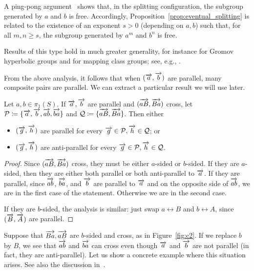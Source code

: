 \begin{remark}
A ping-pong argument~\cite[\S 8.2.E]{Gromov1987HyperbolicGroups}
shows that, in the splitting configuration, the subgroup generated by $a$ and $b$
is free.
Accordingly, Proposition~\ref{prop:eventual_splitting} is related to the existence
of an exponent $s>0$ (depending on $a,b$) such that, for all $m,n \ge s$,
the subgroup generated by $a^m$ and $b^n$ is free.

Results of this type hold in much greater generality, for instance for
Gromov hyperbolic groups and for mapping class groups; see, e.g.,
\cite{Fujiwara2015SubgroupsPseudoAnosovII}.
\end{remark}

From the above analysis, it follows that when $(\overrightarrow{a},\overrightarrow{b})$ are
parallel, many composite pairs are parallel. We can extract a
particular result we will use later.
\begin{lemma}\label{lem:a_parallel_Ba}
Let $a,b \in \pi_1(S)$.
If $\overrightarrow{a},\overrightarrow{b}$ are parallel and $(\overrightarrow{aB}, \overrightarrow{Ba})$ cross,
let $\mathcal{P} \coloneqq \{ \overrightarrow{a},\overrightarrow{b}, \overrightarrow{ab},\overrightarrow{ba} \}$
and $\mathcal{Q} \coloneqq \{ \overrightarrow{aB}, \overrightarrow{Ba} \}$. Then either
\begin{itemize}
\item $(\overrightarrow{g},\overrightarrow{h})$ are parallel for every $\overrightarrow{g} \in \mathcal{P}, \overrightarrow{h} \in \mathcal{Q}$; or
\item $(\overrightarrow{g},\overrightarrow{h})$ are anti-parallel for every $\overrightarrow{g} \in \mathcal{P}, \overrightarrow{h} \in \mathcal{Q}$.
\end{itemize}
\end{lemma}
\begin{proof}
Since
$(\overrightarrow{aB},\overrightarrow{Ba})$ cross, they must be either $a$-sided or
$b$-sided.
If they are $a$-sided, then they are either both parallel or both
anti-parallel to $\overrightarrow{a}$.
If they are parallel, since $\overrightarrow{ab}$, $\overrightarrow{ba}$, and $\overrightarrow{b}$ are parallel to
$\overrightarrow{a}$ and on the opposite side of $\overrightarrow{ab}$, we are in the first
case of the statement.
Otherwise we are in the second case.

If they are $b$-sided, the analysis is similar: just swap $a \leftrightarrow B$ and $b \leftrightarrow A$, since $(\overrightarrow{B},\overrightarrow{A})$ are parallel.
\end{proof}

Suppose that $\overrightarrow{Ba},\overrightarrow{aB}$ are $b$-sided and cross, as in Figure~\ref{fig:c2}. If we replace $b$ by $B$, we see that $\overrightarrow{ab}$ and
$\overrightarrow{ba}$ can cross even though $\overrightarrow{a}$ and $\overrightarrow{b}$ are not
parallel (in fact, they are anti-parallel). Let us show a concrete
example where this situation arises. See also the discussion
in~\cite{MGT25:SmoothingsErratum}.

